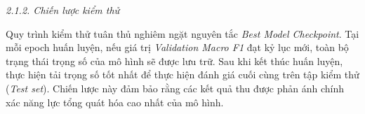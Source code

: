 \textit{2.1.2. Chiến lược kiểm thử}\vspace{0.2cm}

Quy trình kiểm thử tuân thủ nghiêm ngặt nguyên tắc \textit{Best Model Checkpoint}. Tại mỗi epoch huấn luyện, nếu giá trị \textit{Validation Macro F1} đạt kỷ lục mới, toàn bộ trạng thái trọng số của mô hình sẽ được lưu trữ. Sau khi kết thúc huấn luyện, thực hiện tải trọng số tốt nhất để thực hiện đánh giá cuối cùng trên tập kiểm thử (\textit{Test set}). Chiến lược này đảm bảo rằng các kết quả thu được phản ánh chính xác năng lực tổng quát hóa cao nhất của mô hình.